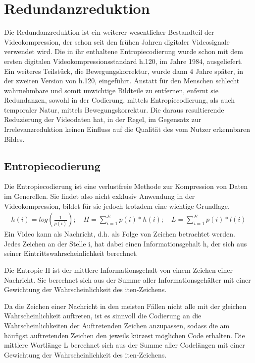 \chapter{Redundanzreduktion}
\label{kap:Redundanzreduktion}
Die Redundanzreduktion ist ein weiterer wesentlicher Bestandteil der Videokompression, der schon seit den frühen Jahren digitaler Videosignale verwendet wird.
Die in ihr enthaltene Entropiecodierung wurde schon mit dem ersten digitalen Videokompressionsstandard h.120, im Jahre 1984, ausgeliefert. Ein weiteres Teilstück, die Bewegungskorrektur, wurde dann 4 Jahre später, in der zweiten Version von h.120, eingeführt. Anstatt für den Menschen schlecht wahrnehmbare und somit unwichtige Bildteile zu entfernen, enfernt sie Redundanzen, sowohl in der Codierung, mittels Entropiecodierung, als auch temporaler Natur, mittels Bewegungskorrektur. Die daraus resultierende Reduzierung der Videodaten hat, in der Regel, im Gegensatz zur Irrelevanzreduktion keinen Einfluss auf die Qualität des vom Nutzer erkennbaren Bildes.
\section{Entropiecodierung}
Die Entropiecodierung ist eine verlustfreie Methode zur Kompression von Daten im Generellen. Sie findet also nicht exklusiv Anwendung in der Videokompression, bildet für sie jedoch trotzdem eine wichtige Grundlage.
\begin{align*}
h(i) = log(\frac{1}{p(i)});\quad H = \sum_{i=1}^E p(i) * h(i);\quad L = \sum_{i=1}^E p(i) * l(i)
\end{align*}
Ein Video kann als Nachricht, d.h. als Folge von Zeichen betrachtet werden. Jedes Zeichen an der Stelle i, hat dabei einen Informationsgehalt h, der sich aus seiner Eintrittswahrscheinlichkeit berechnet.

Die Entropie H ist der mittlere Informationsgehalt von einem Zeichen einer Nachricht.
Sie berechnet sich aus der Summe aller Informationsgehälter mit einer Gewichtung der Wahrscheinlichkeit des iten-Zeichens.

Da die Zeichen einer Nachricht in den meisten Fällen nicht alle mit der gleichen Wahrscheinlichkeit auftreten, ist es sinnvoll die Codierung an die Wahrscheinlichkeiten der Auftretenden Zeichen anzupassen, sodass die am häufigst auftretenden Zeichen den jeweils kürzest möglichen Code erhalten.\cite{symes_peter_digital_2004}
Die mittlere Wortlänge L berechnet sich aus der Summe aller Codelängen mit einer Gewichtung der Wahrscheinlichkeit des iten-Zeichens.

